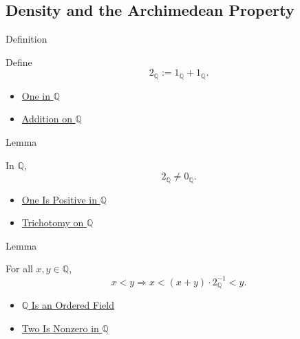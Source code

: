 \subsection*{Density and the Archimedean Property}

\begin{definitionbox}{Definition}
\begin{definition}
\label{def:two-in-q}
Define
\[
2_{\mathbb{Q}}:=1_{\mathbb{Q}}+1_{\mathbb{Q}}.
\]
\end{definition}
\end{definitionbox}

\begin{dependencies}
\begin{itemize}
  \item \hyperref[def:one-in-q]{One in $\mathbb{Q}$}
  \item \hyperref[def:addition-on-q-classes]{Addition on $\mathbb{Q}$}
\end{itemize}
\end{dependencies}

\begin{lemmabox}{Lemma}
\begin{lemma}
\label{lem:two-nonzero-in-q}
In $\mathbb{Q}$,
\[
2_{\mathbb{Q}}\ne 0_{\mathbb{Q}}.
\]
\end{lemma}
\end{lemmabox}

\begin{dependencies}
\begin{itemize}
  \item \hyperref[cor:one-positive-on-q]{One Is Positive in $\mathbb{Q}$}
  \item \hyperref[thm:trichotomy-on-q]{Trichotomy on $\mathbb{Q}$}
\end{itemize}
\end{dependencies}

\begin{lemmabox}{Lemma}
\begin{lemma}
\label{lem:midpoint-between-q}
For all $x,y\in\mathbb{Q}$,
\[
x<y
\Longrightarrow
x< (x+y)\cdot 2_{\mathbb{Q}}^{-1}<y.
\]
\end{lemma}
\end{lemmabox}

\begin{dependencies}
\begin{itemize}
  \item \hyperref[thm:q-is-an-ordered-field]{$\mathbb{Q}$ Is an Ordered Field}
  \item \hyperref[lem:two-nonzero-in-q]{Two Is Nonzero in $\mathbb{Q}$}
\end{itemize}
\end{dependencies}

